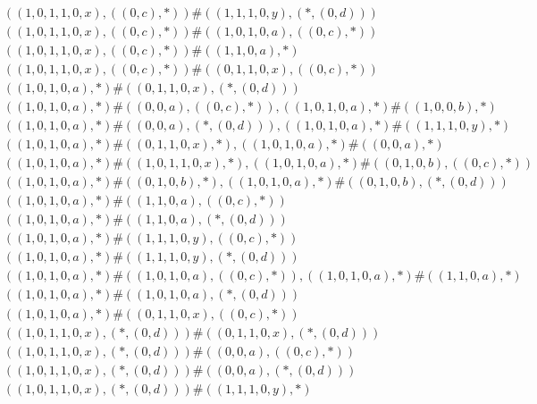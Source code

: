\begin{align*}
	 & \qquad ((1, 0, 1, 1, 0, x), ((0, c), *)) \# ((1, 1, 1, 0, y), (*, (0, d))) \\ 
	 & \qquad ((1, 0, 1, 1, 0, x), ((0, c), *)) \# ((1, 0, 1, 0, a), ((0, c), *)) \\ 
	 & \qquad ((1, 0, 1, 1, 0, x), ((0, c), *)) \# ((1, 1, 0, a), *) \\ 
	 & \qquad ((1, 0, 1, 1, 0, x), ((0, c), *)) \# ((0, 1, 1, 0, x), ((0, c), *)) \\ 
	 & \qquad ((1, 0, 1, 0, a), *) \# ((0, 1, 1, 0, x), (*, (0, d))) \\ 
	 & \qquad ((1, 0, 1, 0, a), *) \# ((0, 0, a), ((0, c), *)), ((1, 0, 1, 0, a), *) \# ((1, 0, 0, b), *) \\ 
	 & \qquad ((1, 0, 1, 0, a), *) \# ((0, 0, a), (*, (0, d))), ((1, 0, 1, 0, a), *) \# ((1, 1, 1, 0, y), *) \\ 
	 & \qquad ((1, 0, 1, 0, a), *) \# ((0, 1, 1, 0, x), *), ((1, 0, 1, 0, a), *) \# ((0, 0, a), *) \\ 
	 & \qquad ((1, 0, 1, 0, a), *) \# ((1, 0, 1, 1, 0, x), *), ((1, 0, 1, 0, a), *) \# ((0, 1, 0, b), ((0, c), *)) \\ 
	 & \qquad ((1, 0, 1, 0, a), *) \# ((0, 1, 0, b), *), ((1, 0, 1, 0, a), *) \# ((0, 1, 0, b), (*, (0, d))) \\ 
	 & \qquad ((1, 0, 1, 0, a), *) \# ((1, 1, 0, a), ((0, c), *)) \\ 
	 & \qquad ((1, 0, 1, 0, a), *) \# ((1, 1, 0, a), (*, (0, d))) \\ 
	 & \qquad ((1, 0, 1, 0, a), *) \# ((1, 1, 1, 0, y), ((0, c), *)) \\ 
	 & \qquad ((1, 0, 1, 0, a), *) \# ((1, 1, 1, 0, y), (*, (0, d))) \\ 
	 & \qquad ((1, 0, 1, 0, a), *) \# ((1, 0, 1, 0, a), ((0, c), *)), ((1, 0, 1, 0, a), *) \# ((1, 1, 0, a), *) \\ 
	 & \qquad ((1, 0, 1, 0, a), *) \# ((1, 0, 1, 0, a), (*, (0, d))) \\ 
	 & \qquad ((1, 0, 1, 0, a), *) \# ((0, 1, 1, 0, x), ((0, c), *)) \\ 
	 & \qquad ((1, 0, 1, 1, 0, x), (*, (0, d))) \# ((0, 1, 1, 0, x), (*, (0, d))) \\ 
	 & \qquad ((1, 0, 1, 1, 0, x), (*, (0, d))) \# ((0, 0, a), ((0, c), *)) \\ 
	 & \qquad ((1, 0, 1, 1, 0, x), (*, (0, d))) \# ((0, 0, a), (*, (0, d))) \\ 
	 & \qquad ((1, 0, 1, 1, 0, x), (*, (0, d))) \# ((1, 1, 1, 0, y), *) \\ 

\end{align*}
